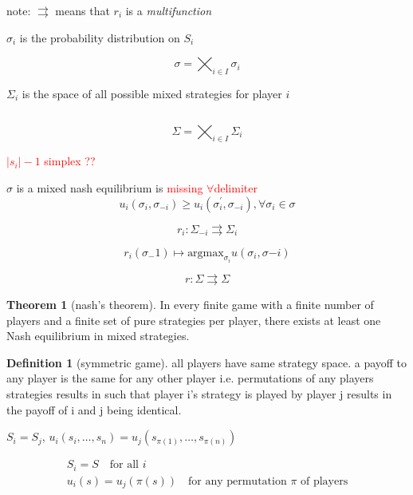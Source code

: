 \documentclass{article}
\theoremstyle{definition}
\newtheorem{definition}{Definition}
\newtheorem{theorem}{Theorem}
\newcommand{\abs}[1]{\left| #1 \right|}
\begin{document}
note: \(\rightrightarrows\) means that \(r_i\) is a \emph{multifunction}

\(\sigma_i\) is the probability distribution on \(S_i\)

\begin{equation}
    \sigma = \bigtimes_{i \in I} \sigma_i
\end{equation}


\(\Sigma_i\) is the space of all possible mixed strategies for player \(i\)

\(\)


\begin{equation}
    \Sigma = \bigtimes_{i \in I} \Sigma_i
\end{equation}

\textcolor{red}{\(\abs{s_i}-1\) simplex ??}




\(\sigma\) is a mixed nash equilibrium is \textcolor{red}{missing \(\forall\)delimiter}
\begin{equation}
    u_i(\sigma_i,\sigma_{-i})\geq u_i(\sigma^\prime_i,\sigma_{-i}),\forall\sigma_i \in \sigma
\end{equation}

\begin{equation}
    r_i: \Sigma_{-i}\rightrightarrows \Sigma_i
\end{equation}

\begin{equation}
    r_i(\sigma_-1)\mapsto \text{argmax}_{\sigma_i} u(\sigma_i,\sigma{-i})
\end{equation}

\begin{equation}
    r: \Sigma\rightrightarrows \Sigma
\end{equation}

\begin{theorem}[nash's theorem]
    In every finite game with a finite number of players and a finite set of pure strategies per player, there exists at least one Nash equilibrium in mixed strategies.
\end{theorem}


\begin{definition}[symmetric game]
    all players have same strategy space. a payoff to any player is the same for any other player i.e. permutations of any players strategies results in such that player i's strategy is played by player j results in the payoff of i and j being identical.
\end{definition}

\(S_i = S_j\), \(u_i(s_i,\dots,s_n) = u_j(s_{\pi(1)},\dots, s_{\pi(n)})\)

\begin{equation}
    \begin{split}
        S_i = S \quad \text{for all } i \\
        u_i(s) = u_j(\pi(s)) \quad \text{for any permutation } \pi \text{ of players}
    \end{split}
\end{equation}
\end{document}
